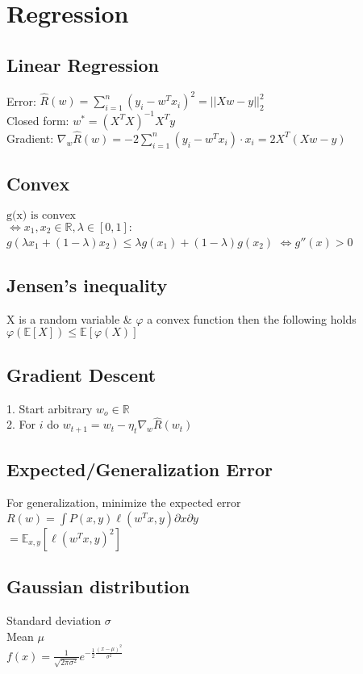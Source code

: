 \section*{Regression}
\subsection*{Linear Regression}
Error: $\hat{R}(w) = \sum_{i=1}^n (y_i - w^Tx_i)^2 = ||Xw-y||^2_2$\\
Closed form: $w^*=(X^T X)^{-1} X^T y$\\
Gradient: $\nabla_w \hat{R}(w) = -2 \sum_{i=1}^n (y_i-w^T x_i) \cdot x_i = 2X^T (Xw-y)$

\subsection*{Convex}
$\text{g(x) is convex}$\\
$\Leftrightarrow x_1,x_2 \in \mathbb{R}, \lambda \in [0,1]:$\\
$g(\lambda x_1 + (1-\lambda) x_2) \leq \lambda g(x_1) + (1-\lambda) g(x_2)$
$ \Leftrightarrow g''(x) > 0$

\subsection*{Jensen's inequality}
X is a random variable \& $\varphi$ a convex function then the following holds 
$\varphi(\mathbb{E}[X]) \leq \mathbb{E}[\varphi(X)]$

\subsection*{Gradient Descent}
1. Start arbitrary $w_o \in \mathbb{R}$\\
2. For $i$ do $w_{t+1} = w_t - \eta_t \nabla_w \hat{R}(w_t)$


\subsection*{Expected/Generalization Error}
For generalization, minimize the expected error
$R(w) = \int P(x,y) \ell(w^Tx,y) \partial x \partial y$\\
$= \mathbb{E}_{x,y}[\ell(w^Tx,y)^2]$

\subsection*{Gaussian distribution}
Standard deviation $\sigma$ \\
Mean $\mu$ \\
$f(x) = \frac{1}{\sqrt{2\pi \sigma^2}} e^{- \frac{1}{2} \frac{(x-\mu)^2}{\sigma^2}}$

